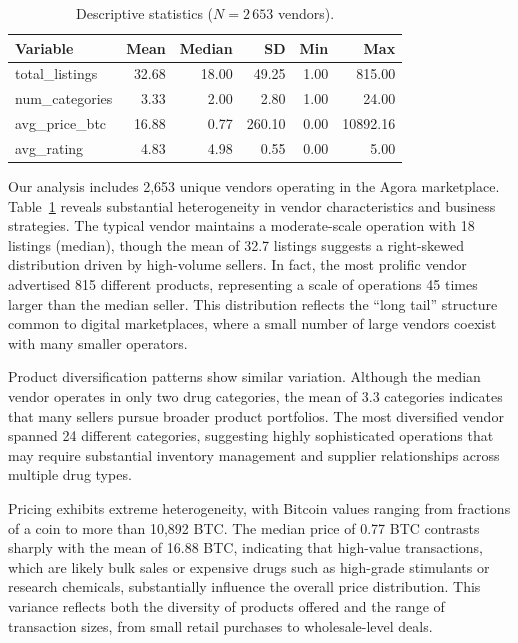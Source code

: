 \documentclass{article}
\begin{document}
\begin{table}[htbp]
  \centering
  \scriptsize
  \setlength\tabcolsep{4pt}
  \begin{tabular}{lrrrrr}
    \toprule
    Variable              &   Mean & Median &    SD &    Min &      Max \\
    \midrule
    total\_listings       &  32.68 & 18.00 & 49.25 &  1.00 &  815.00 \\
    num\_categories       &   3.33 &  2.00 &  2.80 &  1.00 &   24.00 \\
    avg\_price\_btc       &  16.88 &  0.77 &260.10 &  0.00 &10892.16 \\
    avg\_rating           &   4.83 &  4.98 &  0.55 &  0.00 &    5.00 \\
    \bottomrule
  \end{tabular}
  \caption{Descriptive statistics ($N=2\,653$ vendors).}
  \label{tab:descriptives}
\end{table}

Our analysis includes 2,653 unique vendors operating in the Agora marketplace. Table~\ref{tab:descriptives} reveals substantial heterogeneity in vendor characteristics and business strategies. The typical vendor maintains a moderate-scale operation with 18 listings (median), though the mean of 32.7 listings suggests a right-skewed distribution driven by high-volume sellers. In fact, the most prolific vendor advertised 815 different products, representing a scale of operations 45 times larger than the median seller. This distribution reflects the ``long tail'' structure common to digital marketplaces, where a small number of large vendors coexist with many smaller operators.

Product diversification patterns show similar variation. Although the median vendor operates in only two drug categories, the mean of 3.3 categories indicates that many sellers pursue broader product portfolios. The most diversified vendor spanned 24 different categories, suggesting highly sophisticated operations that may require substantial inventory management and supplier relationships across multiple drug types.

Pricing exhibits extreme heterogeneity, with Bitcoin values ranging from fractions of a coin to more than 10,892 BTC. The median price of 0.77 BTC contrasts sharply with the mean of 16.88 BTC, indicating that high-value transactions, which are likely bulk sales or expensive drugs such as high-grade stimulants or research chemicals, substantially influence the overall price distribution. This variance reflects both the diversity of products offered and the range of transaction sizes, from small retail purchases to wholesale-level deals.
\end{document}
